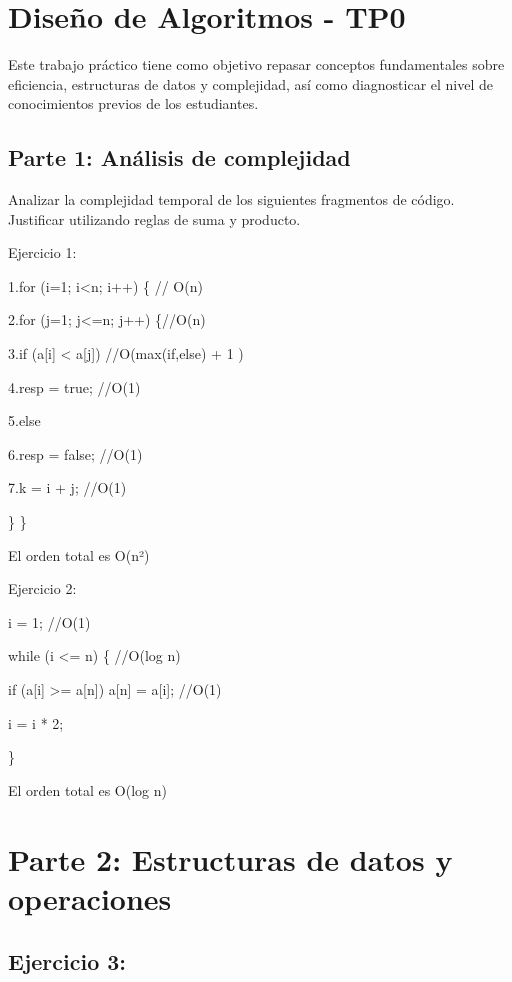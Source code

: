 \documentclass[11pt]{article}
\author{Marisol}
\date{\today}
\title{}
\begin{document}
\tableofcontents

\section{Diseño de Algoritmos - TP0}
\label{sec:org0a4bca7}


Este trabajo práctico tiene como objetivo repasar conceptos fundamentales sobre eficiencia,
estructuras de datos y complejidad, así como diagnosticar el nivel de conocimientos previos
de los estudiantes.

\subsection{Parte 1: Análisis de complejidad}
\label{sec:org74505f2}

Analizar la complejidad temporal de los siguientes fragmentos de código. Justificar
utilizando reglas de suma y producto.

Ejercicio 1:

1.for (i=1; i<n; i++) \{ // O(n)

2.for (j=1; j<=n; j++) \{//O(n)

3.if (a[i] < a[j]) //O(max(if,else) + 1 )

4.resp = true;  //O(1)

5.else

6.resp = false; //O(1)

7.k = i + j; //O(1)

\}
\}

El orden total es O(n²)


Ejercicio 2:

i = 1; //O(1)

while (i <= n) \{ //O(log n)

if (a[i] >= a[n]) a[n] = a[i]; //O(1)

i = i * 2;

\}


El orden total es O(log n)




\section{Parte 2: Estructuras de datos y operaciones}
\label{sec:org407af14}

\subsection{Ejercicio 3:}
\label{sec:orgf03ebbe}
\end{document}
